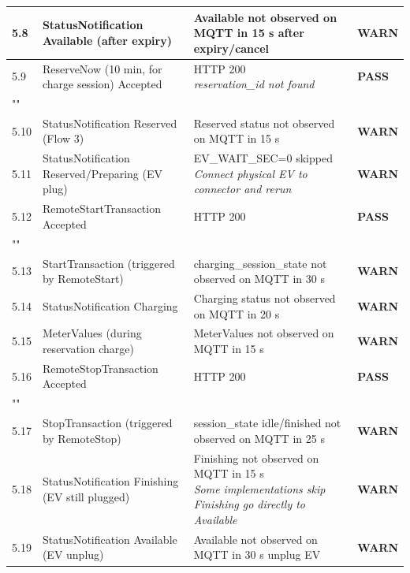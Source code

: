 \documentclass[10pt, a4paper]{article}
\begin{document}
\begin{longtable}{|L{1cm}|L{5.5cm}|M{7cm}|C{1.8cm}|}
\hline
\small 5.8 & \small StatusNotification Available (after expiry) & Available not observed on MQTT in 15 s after expiry/cancel & \textcolor{warnorange}{\textbf{WARN}} \\
\hline
\small 5.9 & \small ReserveNow (10 min, for charge session)  Accepted & HTTP 200{\newline\normalfont\footnotesize\itshape reservation\_id not found} & \textcolor{passgreen}{\textbf{PASS}} \\
\hline
{} \\
\hline
\small 5.10 & \small StatusNotification Reserved (Flow 3) & Reserved status not observed on MQTT in 15 s & \textcolor{warnorange}{\textbf{WARN}} \\
\hline
\small 5.11 & \small StatusNotification Reserved/Preparing (EV plug) & EV\_WAIT\_SEC=0  skipped{\newline\normalfont\footnotesize\itshape Connect physical EV to connector and rerun} & \textcolor{warnorange}{\textbf{WARN}} \\
\hline
\small 5.12 & \small RemoteStartTransaction  Accepted & HTTP 200 & \textcolor{passgreen}{\textbf{PASS}} \\
\hline
{} \\
\hline
\small 5.13 & \small StartTransaction (triggered by RemoteStart) & charging\_session\_state not observed on MQTT in 30 s & \textcolor{warnorange}{\textbf{WARN}} \\
\hline
\small 5.14 & \small StatusNotification Charging & Charging status not observed on MQTT in 20 s & \textcolor{warnorange}{\textbf{WARN}} \\
\hline
\small 5.15 & \small MeterValues (during reservation charge) & MeterValues not observed on MQTT in 15 s & \textcolor{warnorange}{\textbf{WARN}} \\
\hline
\small 5.16 & \small RemoteStopTransaction  Accepted & HTTP 200 & \textcolor{passgreen}{\textbf{PASS}} \\
\hline
{} \\
\hline
\small 5.17 & \small StopTransaction (triggered by RemoteStop) & session\_state idle/finished not observed on MQTT in 25 s & \textcolor{warnorange}{\textbf{WARN}} \\
\hline
\small 5.18 & \small StatusNotification Finishing (EV still plugged) & Finishing not observed on MQTT in 15 s{\newline\normalfont\footnotesize\itshape Some implementations skip Finishing  go directly to Available} & \textcolor{warnorange}{\textbf{WARN}} \\
\hline
\small 5.19 & \small StatusNotification Available (EV unplug) & Available not observed on MQTT in 30 s  unplug EV & \textcolor{warnorange}{\textbf{WARN}} \\
\hline
\end{longtable}
\normalsize
\end{document}
